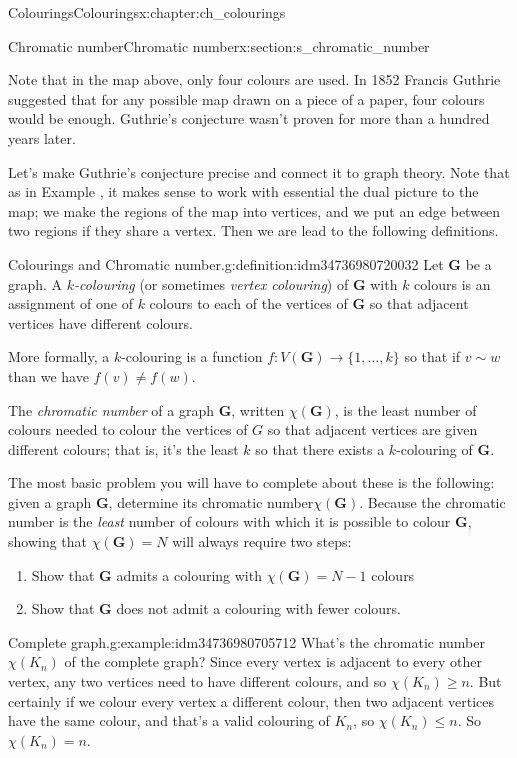 \documentclass[oneside,10pt,]{book}
\numberwithin{equation}{section}
\newcommand{\bfG}{\mathbf{G}}
\begin{document}
\begin{chapterptx}{Colourings}{}{Colourings}{}{}{x:chapter:ch_colourings}
\begin{sectionptx}{Chromatic number}{}{Chromatic number}{}{}{x:section:s_chromatic_number}
\begin{figureptx}
\begin{image}{0.15}{0.7}{0.15}
\end{image}%
\tcblower
\end{figureptx}%
Note that in the map above, only four colours are used.  In 1852 Francis Guthrie suggested that for any possible map drawn on a piece of a paper, four colours would be enough.  Guthrie's conjecture wasn't proven for more than a hundred years later.%
\par
Let's make Guthrie's conjecture precise and connect it to graph theory.  Note that as in Example , it makes sense to work with essential the dual picture to the map; we make the regions of the map into vertices, and we put an edge between two regions if they share a vertex.  Then we are lead to the following definitions.%
\begin{definition}{Colourings and Chromatic number.}{g:definition:idm34736980720032}%
Let \(\bfG\) be a graph.  A \emph{\(k\)-colouring} (or sometimes \emph{vertex colouring}) of \(\bfG\) with \(k\) colours is an assignment of one of \(k\) colours to each of the vertices of \(\bfG\) so that adjacent vertices have different colours.%
\par
More formally, a \(k\)-colouring is a function \(f:V(\bfG)\to\{1,\dots,k\}\) so that if \(v\sim w\) than we have \(f(v)\neq f(w)\).%
\par
The \emph{chromatic number} of a graph \(\bfG\), written \(\chi(\bfG)\), is the least number of colours needed to colour the vertices of \(G\) so that adjacent vertices are given different colours; that is, it's the least \(k\) so that there exists a \(k\)-colouring of \(\bfG\).%
\end{definition}
The most basic problem you will have to complete about these is the following: given a graph \(\bfG\), determine its chromatic number\(\chi(\bfG)\).  Because the chromatic number is the \emph{least} number of colours with which it is possible to colour \(\bfG\), showing that \(\chi(\bfG)=N\) will always require two steps:%
%
\begin{enumerate}
\item{}Show that \(\bfG\) admits a colouring with \(\chi(\bfG)=N-1\) colours%
\item{}Show that \(\bfG\) does not admit a colouring with fewer colours.%
\end{enumerate}
\begin{example}{Complete graph.}{g:example:idm34736980705712}%
What's the chromatic number \(\chi(K_n)\) of the complete graph?  Since every vertex is adjacent to every other vertex, any two vertices need to have different colours, and so \(\chi(K_n)\geq n\).  But certainly if we colour every vertex a different colour, then two adjacent vertices have the same colour, and that's a valid colouring of \(K_n\), so \(\chi(K_n)\leq n\).   So \(\chi(K_n)=n\).%

\end{example}
\end{sectionptx}
\end{chapterptx}
\end{document}
